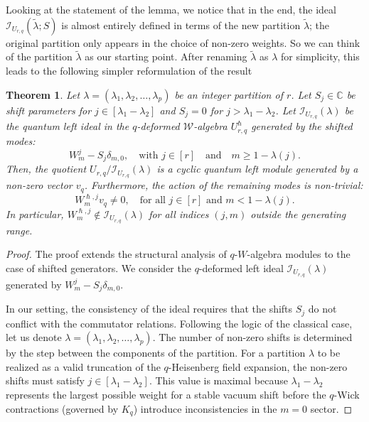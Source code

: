 \documentclass[reqno,11pt]{amsart}
\theoremstyle{plain}
\newtheorem{theorem}{Theorem}[section]
\theoremstyle{definition}
\theoremstyle{remark}
\numberwithin{equation}{section}
\newcommand{\1}{\mathds{1}}
\newcommand{\2}{\frac{1}{2}}
\begin{document}
{				Looking at the statement of the lemma, we notice that in the end, the ideal $\mathcal{I}_{U_{r,q}}(\tilde{\lambda}; S)$
				is almost entirely defined in terms of the new partition $\tilde{\lambda}$; the original partition only
				appears in the choice of non-zero weights. So we can think of the partition $\tilde{\lambda}$ as our
				starting point. After renaming $\tilde{\lambda}$ as $\lambda$ for simplicity, this leads to the following simpler
				reformulation of the result
				\begin{theorem}\label{c:leftidealsshifted}
					Let $\lambda = (\lambda_1, \lambda_2, \ldots, \lambda_p)$ be an integer partition of $r$. Let $S_j \in \mathbb{C}$  be shift parameters  for $j \in [\lambda_1-\lambda_2]$ and $S_j =0$ for $j > \lambda_1-\lambda_2$. Let $\mathcal{I}_{U_{r,q}}(\lambda)$ be the quantum left ideal in the $q$-deformed $\mathcal{W}$-algebra $U^{\hslash}_{r,q}$ generated by the shifted modes:
					\begin{equation}
						W^j_m - S_j \delta_{m,0}, \quad \mbox{with } j \in [r]\quad \mbox{and}\quad m \geq 1 - \lambda(j).
					\end{equation} 
					Then, the quotient $U_{r,q}/ \mathcal{I}_{U_{r,q}}(\lambda)$ is a cyclic quantum  left module generated by a non-zero vector $v_q$. Furthermore, the action of the remaining modes is non-trivial: 
					\begin{equation}
						W^{\hslash, j}_m v_q \neq 0, \quad \mbox{for all } j \in [r] \mbox{ and } m < 1 - \lambda(j).
					\end{equation}
					In particular, $W^{\hslash, j}_m \notin \mathcal{I}_{U_{r,q}}(\lambda)$ for all indices $(j,m)$ outside the generating range.
				\end{theorem}
				\begin{proof}
					{The proof extends the structural analysis of $q$-$W$-algebra modules to the case of shifted generators. We consider the $q$-deformed left ideal $\mathcal{I}_{U_{r,q}}(\lambda)$ generated by $W^j_m - S_j \delta_{m,0}$.}
					
					{In our setting, the consistency of the ideal requires that the shifts $S_j$ do not conflict with the commutator relations. Following the logic of the classical case, let us denote $\lambda = (\lambda_1, \lambda_2, \dots, \lambda_p)$. The number of non-zero shifts is determined by the step between the components of the partition. For a partition $\lambda$ to be realized as a valid truncation of the $q$-Heisenberg field expansion, the non-zero shifts must satisfy $j \in [\lambda_1 - \lambda_2]$. This value is maximal because $\lambda_1 - \lambda_2$ represents the largest possible weight for a stable vacuum shift before the $q$-Wick contractions (governed by ${K}_q$) introduce inconsistencies in the $m=0$ sector.}
					

\end{proof}}
\end{document}
